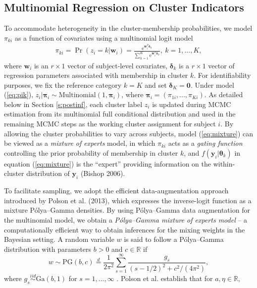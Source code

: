 \documentclass[useAMS,referee]{biom}
\begin{document}
\subsection{Multinomial Regression on Cluster Indicators}
\label{s:multinom}
To accommodate heterogeneity in the cluster-membership probabilities, we model $\pi_{ki}$ as a function of covariates using a multinomial logit model 
\begin{eqnarray}
\label{eq:pik}
\pi_{ki} = \Pr(z_i = k|\mathbf{w}_i) = \frac{\text{e}^{\mathbf{w}_i^T \boldsymbol\delta_k}}{\sum_{h = 1}^K \text{e}^{\mathbf{w}_i^T \boldsymbol\delta_{h}}},~ k=1,\ldots,K,
\end{eqnarray}
where $\mathbf{w}_i$ is an $r\times 1$ vector of subject-level covariates, $\boldsymbol\delta_k$ is a $r\times 1$ vector of regression parameters associated with membership in cluster $k$. For identifiability purposes, we fix the reference category $k = K$ and set $\boldsymbol\delta_K = \mathbf{0}$. Under model (\ref{eq:pik}), $z_i|\boldsymbol\pi_i \sim \text{Multinomial}(1,\boldsymbol\pi_i)$, where $\boldsymbol\pi_i = (\pi_{1i},...,\pi_{Ki})$. As detailed below in Section \ref{s:postinf}, each cluster label $z_i$ is updated during MCMC estimation from its multinomial full conditional distribution and used in the remaining MCMC steps as the working cluster assignment for subject $i$. By allowing the cluster probabilities to vary across subjects, model (\ref{eq:mixture}) can be viewed as a \textit{mixture of experts} model, in which $\pi_{ki}$ acts as a \textit{gating function} controlling the prior probability of membership in cluster $k$, and $f(\mathbf{y}_i|\boldsymbol\theta_k)$ in equation (\ref{eq:mixture}) is the ``expert'' providing information on the within-cluster distribution of $\mathbf{y}_i$ (Bishop 2006). 

To facilitate sampling, we adopt the efficient data-augmentation approach introduced by Polson {et al.} (2013), which expresses the inverse-logit function as a mixture P\'olya--Gamma densities. By using P\'olya--Gamma data augmentation for the multinomial model, we obtain a \textit{P\'olya--Gamma mixture of experts model} -- a computationally efficient way to obtain inferences for the mixing weights in the Bayesian setting. A random variable ${w}$ is said to follow a P\'olya--Gamma distribution with parameters $b > 0$ and $c \in \mathbb{R}$ if
\begin{equation}
{w} \sim \text{PG}(b,c) \stackrel{d}{=} \frac{1}{2\pi^2}\sum_{s=1}^{\infty}\frac{g_s}{(s-1/2)^2 + c^2/(4\pi^2)}, \label{eq:pg1}
\end{equation}
where $g_s \stackrel{iid}{\sim} \text{Ga}(b,1)$ for $s = 1,...,\infty$ . Polson {et al.} establish that for $a,\eta \in \mathbb{R}$, 
\end{document}
